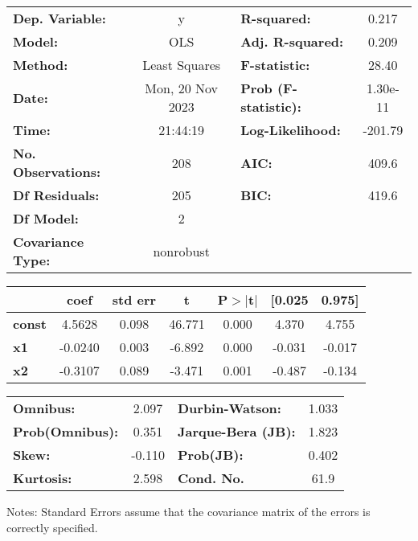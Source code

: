 \begin{center}
\begin{tabular}{lclc}
\toprule
\textbf{Dep. Variable:}    &        y         & \textbf{  R-squared:         } &     0.217   \\
\textbf{Model:}            &       OLS        & \textbf{  Adj. R-squared:    } &     0.209   \\
\textbf{Method:}           &  Least Squares   & \textbf{  F-statistic:       } &     28.40   \\
\textbf{Date:}             & Mon, 20 Nov 2023 & \textbf{  Prob (F-statistic):} &  1.30e-11   \\
\textbf{Time:}             &     21:44:19     & \textbf{  Log-Likelihood:    } &   -201.79   \\
\textbf{No. Observations:} &         208      & \textbf{  AIC:               } &     409.6   \\
\textbf{Df Residuals:}     &         205      & \textbf{  BIC:               } &     419.6   \\
\textbf{Df Model:}         &           2      & \textbf{                     } &             \\
\textbf{Covariance Type:}  &    nonrobust     & \textbf{                     } &             \\
\bottomrule
\end{tabular}
\begin{tabular}{lcccccc}
               & \textbf{coef} & \textbf{std err} & \textbf{t} & \textbf{P$> |$t$|$} & \textbf{[0.025} & \textbf{0.975]}  \\
\midrule
\textbf{const} &       4.5628  &        0.098     &    46.771  &         0.000        &        4.370    &        4.755     \\
\textbf{x1}    &      -0.0240  &        0.003     &    -6.892  &         0.000        &       -0.031    &       -0.017     \\
\textbf{x2}    &      -0.3107  &        0.089     &    -3.471  &         0.001        &       -0.487    &       -0.134     \\
\bottomrule
\end{tabular}
\begin{tabular}{lclc}
\textbf{Omnibus:}       &  2.097 & \textbf{  Durbin-Watson:     } &    1.033  \\
\textbf{Prob(Omnibus):} &  0.351 & \textbf{  Jarque-Bera (JB):  } &    1.823  \\
\textbf{Skew:}          & -0.110 & \textbf{  Prob(JB):          } &    0.402  \\
\textbf{Kurtosis:}      &  2.598 & \textbf{  Cond. No.          } &     61.9  \\
\bottomrule
\end{tabular}
\end{center}

Notes: \newline
 [1] Standard Errors assume that the covariance matrix of the errors is correctly specified.